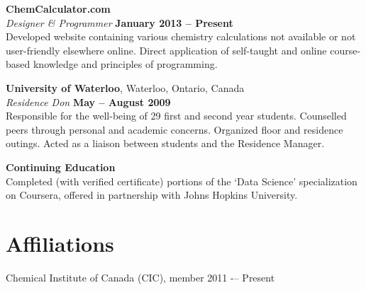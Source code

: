 \documentclass[margin,line]{resume}
\begin{document}
\begin{resume}
    \textbf{ChemCalculator.com}\\\vspace{1mm}%
    \textsl{Designer \& Programmer} \hfill \textbf{January 2013 -- Present}\\
    Developed website containing various chemistry calculations not available or not user-friendly elsewhere online.
    Direct application of self-taught and online course-based knowledge and principles of programming.

    \textbf{University of Waterloo}, Waterloo, Ontario, Canada\\\vspace{1mm}%
    \textsl{Residence Don} \hfill \textbf{May -- August 2009}\\
    Responsible for the well-being of 29 first and second year students.
    Counselled peers through personal and academic concerns.
    Organized floor and residence outings.
    Acted as a liaison between students and the Residence Manager.

	\textbf{Continuing Education}\\
	Completed (with verified certificate) portions of the `Data Science' specialization on Coursera, offered in partnership with Johns Hopkins University.
	
\vspace{1mm}
    \section{\mysidestyle Affiliations} 

    Chemical Institute of Canada (CIC), member 2011 -– Present


\end{resume}
\end{document}
